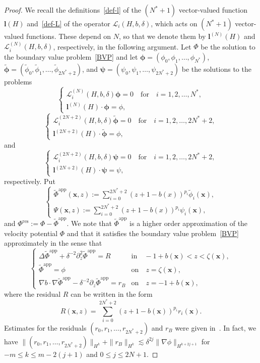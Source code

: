 \documentclass[11pt,leqno]{article}
\numberwithin{equation}{section}
\numberwithin{figure}{section}
\begin{document}
\begin{proof}
We recall the definitions~\eqref{def-l} of the $(N^*+1)$ vector-valued function $\bm{l}(H)$ and~\eqref{def-L} of 
the operator $\mathcal{L}_i(H,b,\delta)$, which acts on $(N^*+1)$ vector-valued functions. 
These depend on $N$, so that we denote them by $\bm{l}^{(N)}(H)$ and $\mathcal{L}_i^{(N)}(H,b,\delta)$, 
respectively, in the following argument. 
Let $\Phi$ be the solution to the boundary value problem~\eqref{BVP} and let 
$\bm{\phi}=(\phi_0,\phi_1,\ldots,\phi_{N^*})$, $\tilde{\bm{\phi}}=(\tilde{\phi}_0,\tilde{\phi}_1,\ldots,\tilde{\phi}_{2N^*+2})$, 
and $\bm{\psi}=(\psi_0,\psi_1,\ldots,\psi_{2N^*+2})$ 
be the solutions to the problems 
%
\[
\begin{cases}
 \mathcal{L}_i^{(N)}(H,b,\delta)\bm{\phi} = 0 \quad \mbox{for}\quad i=1,2,\ldots,N^*, \\
 {\bm l}^{(N)}(H) \cdot \bm{\phi} = \phi,
\end{cases}
\]
%
\[
\begin{cases}
 \mathcal{L}_i^{(2N+2)}(H,b,\delta)\tilde{\bm{\phi}} = 0 \quad \mbox{for}\quad i=1,2,\ldots,2N^*+2, \\
 {\bm l}^{(2N+2)}(H) \cdot \tilde{\bm{\phi}} = \phi,
\end{cases}
\]
%
and 
%
\[
\begin{cases}
 \mathcal{L}_i^{(2N+2)}(H,b,\delta){\bm{\psi}} = 0 \quad \mbox{for}\quad i=1,2,\ldots,2N^*+2, \\
 {\bm l}^{(2N+2)}(H) \cdot {\bm{\psi}} = \psi,
\end{cases}
\]
%
respectively. 
Put 
%
\begin{equation}\label{def-PhiPsi}
\begin{cases}
 \displaystyle
  \tilde{\Phi}^\mathrm{app}(\bm{x},z) := \sum_{i=0}^{2N^*+2}(z+1-b(x))^{p_i}\tilde{\phi}_i(\bm{x}), \\
 \displaystyle
  \Psi(\bm{x},z) := \sum_{i=0}^{2N^*+2}(z+1-b(x))^{p_i}\psi_i(\bm{x}),
\end{cases}
\end{equation}
%
and $\Phi^\mathrm{res}:=\Phi-\tilde{\Phi}^\mathrm{app}$. 
We note that $\tilde{\Phi}^\mathrm{app}$ is a higher order approximation of the velocity potential $\Phi$ 
and that it satisfies the boundary value problem~\eqref{BVP} approximately in the sense that 
%
\[
\begin{cases}
\Delta\tilde{\Phi}^\mathrm{app} + \delta^{-2}\partial_z^2\tilde{\Phi}^\mathrm{app} = R & \mbox{in}\quad -1+b(\bm{x})<z<\zeta(\bm{x}), \\
\tilde{\Phi}^\mathrm{app}=\phi& \mbox{on}\quad z=\zeta(\bm{x}), \\
\nabla b\cdot\nabla\tilde{\Phi}^\mathrm{app} - \delta^{-2}\partial_z\tilde{\Phi}^\mathrm{app} = r_B & \mbox{on}\quad z=-1+b(\bm{x}),
\end{cases}
\]
%
where the residual $R$ can be written in the form 
%
\[
R(\bm{x},z) = \sum_{i=0}^{2N^*+2}(z+1-b(\bm{x}))^{p_i}r_i(\bm{x}).
\]
%
Estimates for the residuals $(r_0,r_1,\ldots,r_{2N^*+2})$ and $r_B$ were given in~\cite[Lemmas 6.4 and 6.9]{Iguchi2018-2}. 
In fact, we have $\|(r_0,r_1,\ldots,r_{2N^*+2})\|_{H^k}+\|r_B\|_{H^k} \lesssim \delta^{2j}\|\nabla\phi\|_{H^{k+2j+1}}$ 
for $-m\leq k\leq m-2(j+1)$ and $0\leq j\leq 2N+1$. 



\end{proof}
\end{document}
